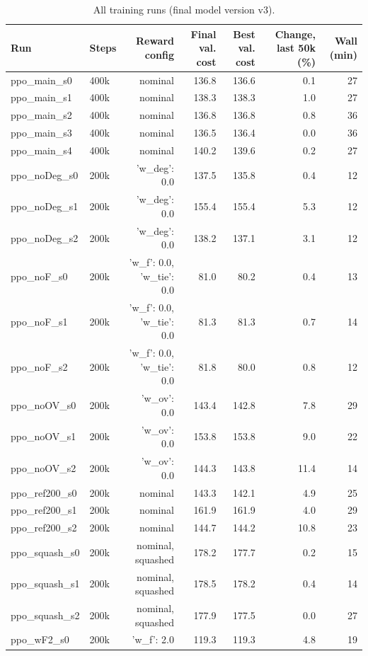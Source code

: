 \begin{longtable}{llrrrrr}
\caption{All training runs (final model version v3).}\label{tab:s_runs}\\
\toprule
\textbf{Run} & \textbf{Steps} & \textbf{Reward config} & \textbf{Final val. cost} & \textbf{Best val. cost} & \textbf{Change, last 50k (\%)} & \textbf{Wall (min)}\\
\midrule
\endhead
ppo\_main\_s0 & 400k & nominal & 136.8 & 136.6 & 0.1 & 27 \\
ppo\_main\_s1 & 400k & nominal & 138.3 & 138.3 & 1.0 & 27 \\
ppo\_main\_s2 & 400k & nominal & 136.8 & 136.8 & 0.8 & 36 \\
ppo\_main\_s3 & 400k & nominal & 136.5 & 136.4 & 0.0 & 36 \\
ppo\_main\_s4 & 400k & nominal & 140.2 & 139.6 & 0.2 & 27 \\
ppo\_noDeg\_s0 & 200k & {'w\_deg': 0.0} & 137.5 & 135.8 & 0.4 & 12 \\
ppo\_noDeg\_s1 & 200k & {'w\_deg': 0.0} & 155.4 & 155.4 & 5.3 & 12 \\
ppo\_noDeg\_s2 & 200k & {'w\_deg': 0.0} & 138.2 & 137.1 & 3.1 & 12 \\
ppo\_noF\_s0 & 200k & {'w\_f': 0.0, 'w\_tie': 0.0} & 81.0 & 80.2 & 0.4 & 13 \\
ppo\_noF\_s1 & 200k & {'w\_f': 0.0, 'w\_tie': 0.0} & 81.3 & 81.3 & 0.7 & 14 \\
ppo\_noF\_s2 & 200k & {'w\_f': 0.0, 'w\_tie': 0.0} & 81.8 & 80.0 & 0.8 & 12 \\
ppo\_noOV\_s0 & 200k & {'w\_ov': 0.0} & 143.4 & 142.8 & 7.8 & 29 \\
ppo\_noOV\_s1 & 200k & {'w\_ov': 0.0} & 153.8 & 153.8 & 9.0 & 22 \\
ppo\_noOV\_s2 & 200k & {'w\_ov': 0.0} & 144.3 & 143.8 & 11.4 & 14 \\
ppo\_ref200\_s0 & 200k & nominal & 143.3 & 142.1 & 4.9 & 25 \\
ppo\_ref200\_s1 & 200k & nominal & 161.9 & 161.9 & 4.0 & 29 \\
ppo\_ref200\_s2 & 200k & nominal & 144.7 & 144.2 & 10.8 & 23 \\
ppo\_squash\_s0 & 200k & nominal, squashed & 178.2 & 177.7 & 0.2 & 15 \\
ppo\_squash\_s1 & 200k & nominal, squashed & 178.5 & 178.2 & 0.4 & 14 \\
ppo\_squash\_s2 & 200k & nominal, squashed & 177.9 & 177.5 & 0.0 & 27 \\
ppo\_wF2\_s0 & 200k & {'w\_f': 2.0} & 119.3 & 119.3 & 4.8 & 19 \\

\end{longtable}
